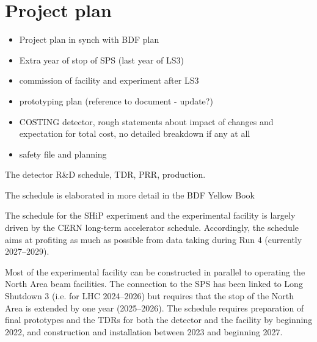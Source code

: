 \section{Project plan}
\label{sec:projectplan}

\begin{itemize}
    \item Project plan in synch with BDF plan
    \item Extra year of stop of SPS (last year of LS3)
    \item commission of facility and experiment after LS3
    \item prototyping plan (reference to document - update?)
    \item COSTING detector, rough statements about impact of changes and expectation for total cost, no detailed breakdown if any at all
    \item safety file and planning
\end{itemize}

The detector R&D schedule, TDR, PRR, production.

The schedule is elaborated in more detail in the BDF Yellow Book~\cite{ref:bdf_yellowbook}

The schedule for the SHiP experiment and the experimental facility is largely driven by the CERN long-term accelerator schedule. Accordingly, the schedule aims at profiting as much as possible from data taking during Run 4 (currently 
2027--2029). 

Most of the experimental facility can be constructed in parallel to operating the North Area beam facilities. The connection to the SPS has been linked to Long Shutdown 3 (i.e. for LHC 2024--2026) but requires that the stop of the North Area is extended by one year (2025--2026). The schedule requires preparation of final prototypes and the TDRs for both the detector and the facility by beginning 2022, and construction and installation between 2023 and beginning 2027.  



